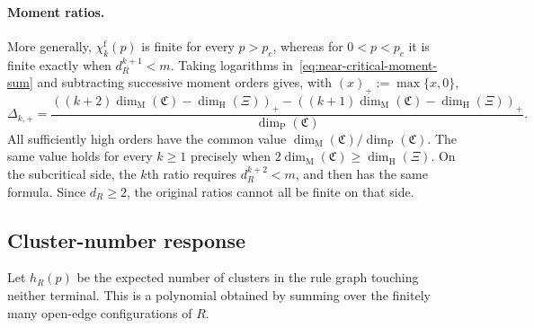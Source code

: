 \documentclass[scheme=plain,11pt]{ctexart}
\theoremstyle{definition}
\theoremstyle{remark}
\newcommand{\dimhaus}{\dim_{\mathrm H}}
\newcommand{\dimmass}{\dim_{\mathrm M}}
\begin{document}
\paragraph{Moment ratios.}
More generally, $\chi_k^{\mathrm f}(p)$ is finite for every $p>p_c$, whereas for $0<p<p_c$ it is finite exactly when $d_R^{k+1}<m$.
Taking logarithms in~\eqref{eq:near-critical-moment-sum} and subtracting successive moment orders gives, with $(x)_+:=\max\{x,0\}$,
\[
 \Delta_{k,+}=
 \frac{((k+2)\dimmass(\mathfrak C)-\dimhaus(\Xi))_+
 -((k+1)\dimmass(\mathfrak C)-\dimhaus(\Xi))_+}
 {\dim_{\mathrm P}(\mathfrak C)}.
\]
All sufficiently high orders have the common value $\dimmass(\mathfrak C)/\dim_{\mathrm P}(\mathfrak C)$.
The same value holds for every $k\ge1$ precisely when $2\dimmass(\mathfrak C)\ge\dimhaus(\Xi)$.
On the subcritical side, the $k$th ratio requires $d_R^{k+2}<m$, and then has the same formula.
Since $d_R\ge2$, the original ratios cannot all be finite on that side.

\subsection*{Cluster-number response}
Let $h_R(p)$ be the expected number of clusters in the rule graph touching neither terminal.
This is a polynomial obtained by summing over the finitely many open-edge configurations of $R$.
\end{document}
